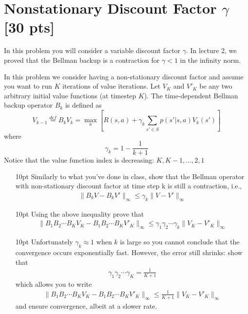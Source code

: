 \documentclass[11pt]{article}
\begin{document}
\section{Nonstationary Discount Factor $\gamma$ [30 pts]}

In this problem you will consider a variable discount factor $\gamma$. In lecture 2, we proved that the Bellman backup is a contraction for $\gamma < 1$ in the infinity norm. 

In this problem we consider having a non-stationary discount factor and assume you want to run $K$ iterations of value iterations. Let $V_K$ and $V'_K$ be any two arbitrary initial value functions (at timestep $K$).
The time-dependent Bellman backup operator $B_k$ is defined as
\begin{equation}
    V_{k-1} \overset{def}{=} B_{k}V_{k} = \max_a[ R(s, a) + \gamma_k\sum_{s' \in S}p(s'|s,a)V_{k}(s')]
\end{equation}
where
\begin{equation}
    \gamma_{k} = 1 - \frac{1}{k+1}
\end{equation}
Notice that the value function index is decreasing: $K,K-1,\dots,2,1$

\begin{enumerate}
\item [10pt] Similarly to what you've done in class, show that the Bellman operator with non-stationary discount factor at time step k is still a contraction, i.e.,  
\begin{align}
\| B_k V - B_k V' \|_\infty
\leq \gamma_k \|V - V' \|_\infty
\end{align}
\item [10pt] Using the above inequality prove that
\begin{align}
\| B_1B_2 \cdots B_K V_K -  B_1B_2 \cdots B_K V'_K \|_\infty
\leq \gamma_1 \gamma_2 \cdots \gamma_k \|V_K - V'_K \|_\infty
\end{align}
\item [10pt] Unfortunately $\gamma_k \approx 1$ when $k$ is large so you cannot conclude that the convergence occurs exponentially fast. However, the error still shrinks: show that
\begin{align}
  \gamma_1 \gamma_2 \cdots \gamma_K = \frac{1}{K+1}
\end{align}
which allows you to write
\begin{align}
\| B_1B_2 \cdots B_K V_K -  B_1B_2 \cdots B_K V'_K \|_\infty \leq \frac{1}{K+1} \|V_K - V'_K \|_\infty
\end{align}
and ensure convergence, albeit at a slower rate.
\end{enumerate}
\end{document}
